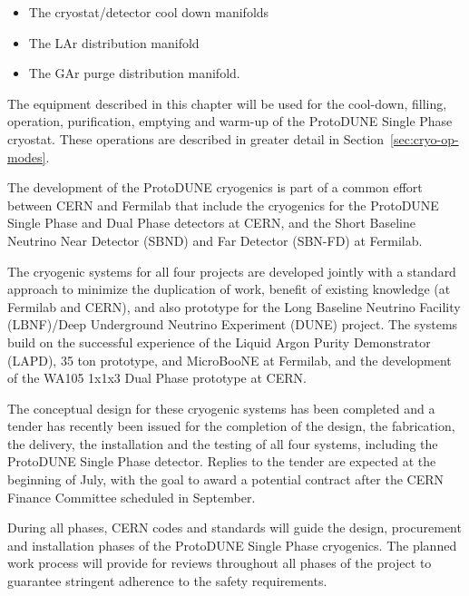 \begin{itemize}
\item The cryostat/detector cool down manifolds
\item The LAr distribution manifold
\item The GAr purge distribution manifold.
\end{itemize}

The equipment described in this chapter will be used for the cool-down, filling, operation, purification, emptying and warm-up of the ProtoDUNE Single Phase cryostat. These operations are described in greater detail in Section~\ref{sec:cryo-op-modes}.

The development of the ProtoDUNE cryogenics is part of a common effort between CERN and Fermilab that include the cryogenics for the ProtoDUNE Single Phase and Dual Phase detectors at CERN, and the Short Baseline Neutrino Near Detector (SBND) and Far Detector (SBN-FD) at Fermilab.

The cryogenic systems for all four projects are developed jointly with a standard approach to minimize the duplication of work, benefit of existing knowledge (at Fermilab and CERN), and also prototype for the Long Baseline Neutrino Facility (LBNF)/Deep Underground Neutrino Experiment (DUNE) project. The systems build on the successful experience of the Liquid Argon Purity Demonstrator (LAPD), 35 ton prototype, and MicroBooNE at Fermilab, and the development of the WA105 1x1x3 Dual Phase prototype at CERN.

The conceptual design for these cryogenic systems has been completed and a tender has recently been issued for the completion of the design, the fabrication, the delivery, the installation and the testing of all four systems, including the ProtoDUNE Single Phase detector. Replies to the tender are expected at the beginning of July, with the goal to award a potential contract after the CERN Finance Committee scheduled in September. \fixme{DM question: is this part ok in this document??]}

During all phases, CERN codes and standards will guide the design, procurement and installation phases of the ProtoDUNE Single Phase cryogenics. The planned work process will provide for reviews throughout all phases of the project to guarantee stringent adherence to the safety requirements.



